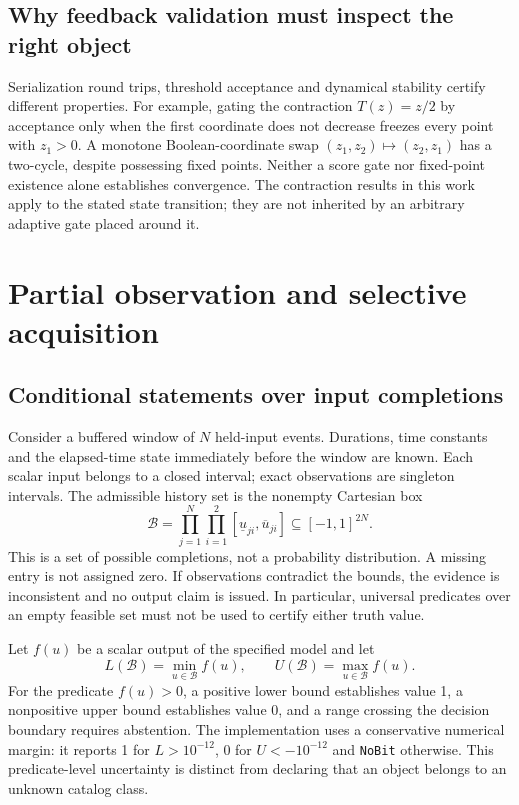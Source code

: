 \documentclass[11pt,a4paper]{article}
\theoremstyle{definition}\newtheorem{definition}[theorem]{Definition}
\begin{document}
\subsection{Why feedback validation must inspect the right object}
Serialization round trips, threshold acceptance and dynamical stability certify different properties. For example, gating the contraction $T(z)=z/2$ by acceptance only when the first coordinate does not decrease freezes every point with $z_1>0$. A monotone Boolean-coordinate swap $(z_1,z_2)\mapsto(z_2,z_1)$ has a two-cycle, despite possessing fixed points. Neither a score gate nor fixed-point existence alone establishes convergence. The contraction results in this work apply to the stated state transition; they are not inherited by an arbitrary adaptive gate placed around it.

\section{Partial observation and selective acquisition}\label{sec:partial}
\subsection{Conditional statements over input completions}
Consider a buffered window of $N$ held-input events. Durations, time constants and the elapsed-time state immediately before the window are known. Each scalar input belongs to a closed interval; exact observations are singleton intervals. The admissible history set is the nonempty Cartesian box
\begin{equation}
 \mathcal B=\prod_{j=1}^{N}\prod_{i=1}^{2}[\underline u_{ji},\overline u_{ji}]
 \subseteq[-1,1]^{2N}.\label{eq:inputbox}
\end{equation}
This is a set of possible completions, not a probability distribution. A missing entry is not assigned zero. If observations contradict the bounds, the evidence is inconsistent and no output claim is issued. In particular, universal predicates over an empty feasible set must not be used to certify either truth value.

Let $f(u)$ be a scalar output of the specified model and let
\begin{equation}
 L(\mathcal B)=\min_{u\in\mathcal B}f(u),\qquad
 U(\mathcal B)=\max_{u\in\mathcal B}f(u).\label{eq:range}
\end{equation}
For the predicate $f(u)>0$, a positive lower bound establishes value 1, a nonpositive upper bound establishes value 0, and a range crossing the decision boundary requires abstention. The implementation uses a conservative numerical margin: it reports 1 for $L>10^{-12}$, 0 for $U<-10^{-12}$ and \texttt{NoBit} otherwise. This predicate-level uncertainty is distinct from declaring that an object belongs to an unknown catalog class.
\end{document}
